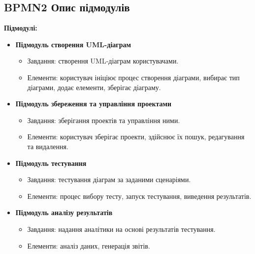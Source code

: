 \documentclass[oneside,14pt]{extarticle}
\begin{document}
\begin{normalsize}
    \subsection*{BPMN2 Опис підмодулів}
    \textbf{Підмодулі:}
    \begin{itemize}
    	\item \textbf{Підмодуль створення UML-діаграм}
    	\begin{itemize}
    		\item Завдання: створення UML-діаграм користувачами.
    		\item Елементи: користувач ініціює процес створення діаграми, вибирає тип діаграми, додає елементи, зберігає діаграму.
    	\end{itemize}
    	\item \textbf{Підмодуль збереження та управління проектами}
    	\begin{itemize}
    		\item Завдання: зберігання проектів та управління ними.
    		\item Елементи: користувач зберігає проекти, здійснює їх пошук, редагування та видалення.
    	\end{itemize}
    	\item \textbf{Підмодуль тестування}
    	\begin{itemize}
    		\item Завдання: тестування діаграм за заданими сценаріями.
    		\item Елементи: процес вибору тесту, запуск тестування, виведення результатів.
    	\end{itemize}
    	\item \textbf{Підмодуль аналізу результатів}
    	\begin{itemize}
    		\item Завдання: надання аналітики на основі результатів тестування.
    		\item Елементи: аналіз даних, генерація звітів.
    	\end{itemize}
    \end{itemize}
    

\end{normalsize}
\end{document}
